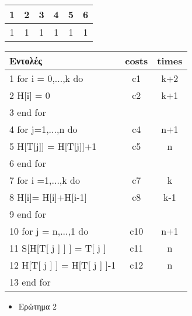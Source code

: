 \documentclass[a4paper]{article}
\begin{document}
\begin{tabular}{|c|c|c|c|c|c|}
1 & 2 & 3 & 4 & 5 & 6\\
\hline
1 & 1 & 1 & 1 & 1 & 1\\\hline
\end{tabular}
\begin{tabular}{|l|c|c|}
\hline
Εντολές & costs & times \\
\hline
1  for i = 0,...,k do   & c1 & k+2\\
\hline
2  H[i] = 0 & c2 & k+1 \\
\hline
3  end for & & \\
\hline
4  for j=1,...,n do & c4 & n+1 \\ 
\hline 
5 H[T[j]] = H[T[j]]+1 & c5 & n  \\
\hline
6 end for &  & \\
\hline
7 for i =1,...,k do & c7 & k   \\
\hline
8 H[i]= H[i]+H[i-1] & c8 & k-1 \\
\hline
9 end for & &   \\
\hline 
10 for j = n,...,1 do & c10 & n+1 \\
\hline
11 S[H[T[ j ] ] ] = T[ j ] & c11 & n \\
\hline
12 H[T[ j ] ] = H[T[ j ] ]-1 & c12 & n \\
\hline
13 end for & &  \\
\hline

\end{tabular}

\begin{itemize}
\item Ερώτημα 2
\end{itemize}
\begin{lstlisting}[mathescape]

 \end{lstlisting}
\end{document}
